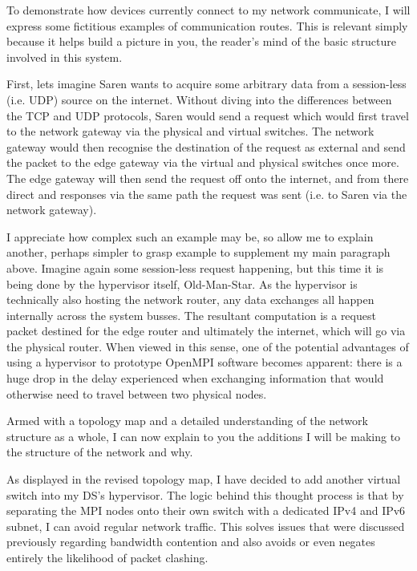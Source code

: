 \textbf{}

To demonstrate how devices currently connect to my network communicate, I will express some fictitious examples of communication routes. This is relevant simply because it helps build a picture in you, the reader's mind of the basic structure involved in this system.

First, lets imagine Saren wants to acquire some arbitrary data from a session-less (i.e. UDP) source on the internet. Without diving into the differences between the TCP and UDP protocols, Saren would send a request which would first travel to the network gateway via the physical and virtual switches. The network gateway would then recognise the destination of the request as external and send the packet to the edge gateway via the virtual and physical switches once more. The edge gateway will then send the request off onto the internet, and from there direct and responses via the same path the request was sent (i.e. to Saren via the network gateway).

I appreciate how complex such an example may be, so allow me to explain another, perhaps simpler to grasp example to supplement my main paragraph above. Imagine again some session-less request happening, but this time it is being done by the hypervisor itself, Old-Man-Star. As the hypervisor is technically also hosting the network router, any data exchanges all happen internally across the system busses. The resultant computation is a request packet destined for the edge router and ultimately the internet, which will go via the physical router. When viewed in this sense, one of the potential advantages of using a hypervisor to prototype OpenMPI software becomes apparent: there is a huge drop in the delay experienced when exchanging information that would otherwise need to travel between two physical nodes.

\textbf{}

Armed with a topology map and a detailed understanding of the network structure as a whole, I can now explain to you the additions I will be making to the structure of the network and why.

As displayed in the revised topology map, I have decided to add another virtual switch into my DS's hypervisor. The logic behind this thought process is that by separating the MPI nodes onto their own switch with a dedicated IPv4 and IPv6 subnet, I can avoid regular network traffic. This solves issues that were discussed previously regarding bandwidth contention and also avoids or even negates entirely the likelihood of packet clashing.

